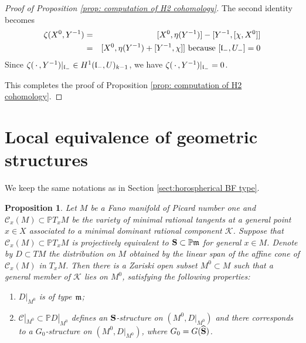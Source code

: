 \documentclass[12pt]{amsart}
\theoremstyle{plain}
\newtheorem{proposition}[theorem]{Proposition}
\theoremstyle{definition}
\begin{document}
\begin{proof} [Proof of Proposition \ref{prop: computation of H2 cohomology}]
The second identity becomes
\begin{eqnarray*}
\zeta(X^0, Y^{-1}) &=& [X^0, \eta(Y^{-1})] -[Y^{-1}, [\chi, X^0]] \\
&=& [X^0, \eta(Y^{-1}) + [Y^{-1}, \chi]] \text{ because } [\frak l_-,   U_-]=0
\end{eqnarray*}
Since $\zeta(\,\cdot\,, Y^{-1}) |_{\frak l_-} \in H^1(\frak l_-, U)_{k-1}$, we have  $\zeta(\,\cdot\,, Y^{-1}) |_{\frak l_-} =0$.


This completes the proof of Proposition \ref{prop: computation of H2 cohomology}.
  \end{proof}



\section{Local equivalence of geometric structures} \label{sect:local equivalence}



We keep the same notations as in Section \ref{sect:horospherical BF type}.

\begin{proposition} \label{extension to rationally connected open subset}
Let $M$ be a Fano manifold of Picard number one and $\mathcal C_x(M) \subset \mathbb PT_xM$ be the variety of minimal rational tangents at a general point $x \in X$ associated to a minimal dominant rational component $\mathcal K$. Suppose that $\mathcal C_x(M) \subset \mathbb PT_xM$ is projectively equivalent to ${\bf S} \subset \mathbb P \frak m$ for general $x \in M$. Denote by $D \subset TM$   the distribution on $M$ obtained by the  linear span of the affine cone of $\mathcal C_x(M)$ in $T_xM$.
Then there is a Zariski open subset $M^0\subset M$ such that a general member  of $\mathcal K$ lies on $M^0$, satisfying  the following properties:
\begin{enumerate}
\item $D|_{M^0}$ is of type $\frak m$;
\item $\mathcal C|_{M^0}\subset \mathbb P D|_{M^0}$ defines an ${\bf S}$-structure on $(M^0, D|_{M^0})$ and there corresponds to a $G_0$-structure on $(M^0, D|_{M^0})$, where $G_0=G(\widehat{\bf S})$.
\end{enumerate}

\end{proposition}
\end{document}
